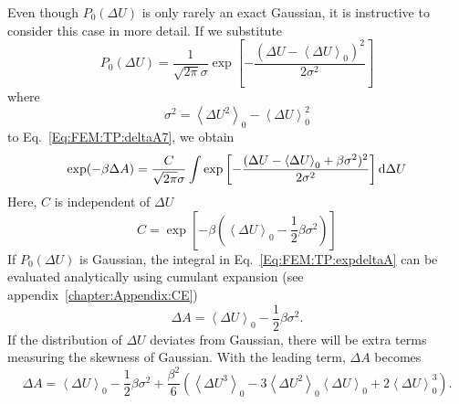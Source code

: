 Even though $P_{0}(\Delta U)$ is only rarely an exact Gaussian, it is instructive to consider this case in more detail. If we substitute
\begin{equation}
  P_{0}(\Delta U) = \frac{1}{\sqrt{2\pi}\sigma}\exp{\left[-\frac{(\Delta U - \left \langle \Delta U \right \rangle_{0})^2}{2\sigma^2}\right]}
  \label{Eq:FEM:TP:gaussian}
\end{equation}
where
\begin{equation}
  \sigma^2 = \left \langle \Delta U^2 \right \rangle_{0} - \left \langle \Delta U \right \rangle_{0}^2
  \label{Eq:FEM:TP:variance}
\end{equation}
to Eq.~\ref{Eq:FEM:TP:deltaA7}, we obtain
\begin{equation}
  \exp(-\beta \Delta A) = \frac{C}{\sqrt{2\pi}\sigma} \int \exp{\left[-\frac{(\Delta U - \left \langle \Delta U \right \rangle_{0} + \beta \sigma ^2)^2}{2\sigma^2}\right]} \mathop{}\!\mathrm{d}\Delta U
  \label{Eq:FEM:TP:expdeltaA}
\end{equation}
Here, $C$ is independent of $\Delta U$
\begin{equation}
  C = \exp{\left[-\beta \left(\left \langle \Delta U \right \rangle_{0} - \frac{1}{2} \beta \sigma ^2\right)\right]}
  \label{Eq:FEM:TP:C}
\end{equation}
If $P_{0}(\Delta U)$ is Gaussian, the integral in Eq.~\ref{Eq:FEM:TP:expdeltaA} can be evaluated analytically using cumulant expansion (see appendix~\ref{chapter:Appendix:CE})
\begin{equation}
  \Delta A = \left< \Delta U \right>_{0} - \frac{1}{2} \beta \sigma ^2.
  \label{Eq:FEM:TP:deltaA8}
\end{equation}
If the distribution of $\Delta U$ deviates from Gaussian, there will be extra terms measuring the skewness of Gaussian. With the leading term, $\Delta A$ becomes
\begin{equation}
  \Delta A = \left< \Delta U \right>_{0} - \frac{1}{2} \beta \sigma ^2 + \frac{\beta^2}{6} \left(\left<\Delta U^3\right>_0-3\left<\Delta U^2\right>_0\left<\Delta U\right>_0+2\left<\Delta U\right>_0^3\right).
  \label{Eq:FEM:TP:deltaA9}
\end{equation}
